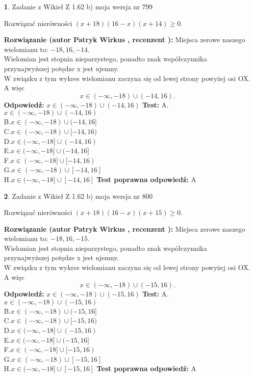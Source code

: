 \documentclass[12pt, a4paper]{article}
\theoremstyle{definition} %
\newtheorem{zad}{}
\newcommand{\zadStart}[1]{\begin{zad}#1\newline}
\newcommand{\zadStop}{\end{zad}}
\newcommand{\rozwStart}[2]{\noindent \textbf{Rozwiązanie (autor #1 , recenzent #2): }\newline}
\newcommand{\rozwStop}{\newline}
\newcommand{\odpStart}{\noindent \textbf{Odpowiedź:}\newline}
\newcommand{\odpStop}{\newline}
\newcommand{\testStart}{\noindent \textbf{Test:}\newline}
\newcommand{\testStop}{\newline}
\newcommand{\kluczStart}{\noindent \textbf{Test poprawna odpowiedź:}\newline}
\newcommand{\kluczStop}{\newline}
\begin{document}
\zadStart{Zadanie z Wikieł Z 1.62 b) moja wersja nr 799}

Rozwiązać nierówności $(x+18)(16-x)(x+14)\ge0$.
\zadStop
\rozwStart{Patryk Wirkus}{}
Miejsca zerowe naszego wielomianu to: $-18, 16, -14$.\\
Wielomian jest stopnia nieparzystego, ponadto znak współczynnika przy\linebreak najwyższej potędze x jest ujemny.\\ W związku z tym wykres wielomianu zaczyna się od lewej strony powyżej osi OX. A więc $$x \in (-\infty,-18) \cup (-14,16).$$
\rozwStop
\odpStart
$x \in (-\infty,-18) \cup (-14,16)$
\odpStop
\testStart
A.$x \in (-\infty,-18) \cup (-14,16)$\\
B.$x \in (-\infty,-18) \cup (-14,16]$\\
C.$x \in (-\infty,-18) \cup [-14,16)$\\
D.$x \in (-\infty,-18] \cup (-14,16)$\\
E.$x \in (-\infty,-18] \cup (-14,16]$\\
F.$x \in (-\infty,-18] \cup [-14,16)$\\
G.$x \in (-\infty,-18) \cup [-14,16]$\\
H.$x \in (-\infty,-18] \cup [-14,16]$
\testStop
\kluczStart
A
\kluczStop



\zadStart{Zadanie z Wikieł Z 1.62 b) moja wersja nr 800}

Rozwiązać nierówności $(x+18)(16-x)(x+15)\ge0$.
\zadStop
\rozwStart{Patryk Wirkus}{}
Miejsca zerowe naszego wielomianu to: $-18, 16, -15$.\\
Wielomian jest stopnia nieparzystego, ponadto znak współczynnika przy\linebreak najwyższej potędze x jest ujemny.\\ W związku z tym wykres wielomianu zaczyna się od lewej strony powyżej osi OX. A więc $$x \in (-\infty,-18) \cup (-15,16).$$
\rozwStop
\odpStart
$x \in (-\infty,-18) \cup (-15,16)$
\odpStop
\testStart
A.$x \in (-\infty,-18) \cup (-15,16)$\\
B.$x \in (-\infty,-18) \cup (-15,16]$\\
C.$x \in (-\infty,-18) \cup [-15,16)$\\
D.$x \in (-\infty,-18] \cup (-15,16)$\\
E.$x \in (-\infty,-18] \cup (-15,16]$\\
F.$x \in (-\infty,-18] \cup [-15,16)$\\
G.$x \in (-\infty,-18) \cup [-15,16]$\\
H.$x \in (-\infty,-18] \cup [-15,16]$
\testStop
\kluczStart
A
\kluczStop
\end{document}
